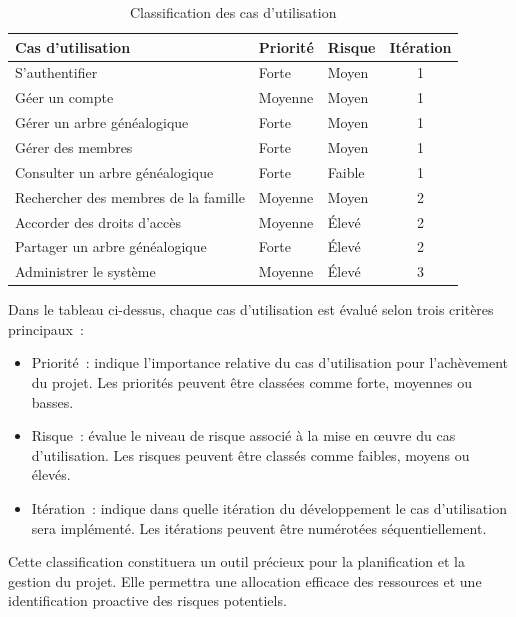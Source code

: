 \begin{table}[htbp]
  \centering
  \begin{tabular}{|l|l|l|c|}
    \hline
    \textbf{Cas d'utilisation} & \textbf{Priorité} & \textbf{Risque} & \textbf{Itération} \\ \hline
    S'authentifier & Forte & Moyen & 1 \\ \hline
    Géer un compte & Moyenne & Moyen & 1 \\ \hline
    Gérer un arbre généalogique & Forte & Moyen & 1 \\ \hline
    Gérer des membres & Forte & Moyen & 1 \\ \hline
    Consulter un arbre généalogique & Forte & Faible & 1 \\ \hline
    Rechercher des membres de la famille & Moyenne & Moyen & 2 \\ \hline
    Accorder des droits d’accès  & Moyenne & Élevé & 2 \\ \hline
    Partager un arbre généalogique & Forte & Élevé & 2 \\ \hline
    Administrer le système & Moyenne & Élevé & 3 \\ \hline
  \end{tabular}
  \caption{Classification des cas d'utilisation}
\end{table}


Dans le tableau ci-dessus, chaque cas d’utilisation est évalué selon trois critères principaux :

\begin{itemize}

  \item Priorité : indique l’importance relative du cas d’utilisation pour
    l’achèvement du projet. Les priorités peuvent être classées comme forte, moyennes ou basses.

  \item Risque : évalue le niveau de risque associé à la mise en œuvre du cas
    d’utilisation. Les risques peuvent être classés comme faibles, moyens ou élevés.

  \item Itération : indique dans quelle itération du développement le cas
    d’utilisation sera implémenté. Les itérations peuvent être numérotées séquentiellement.

\end{itemize}

Cette classification constituera un outil précieux pour la planification et la
gestion du projet. Elle permettra une allocation efficace des ressources et
une identification proactive des risques potentiels.

